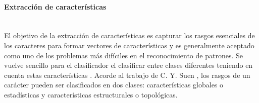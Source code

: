 	
		\paragraph{Extracción de características} ~\\
		
		El objetivo de la extracción de características es capturar los rasgos esenciales de los caracteres para formar vectores de características y es generalmente aceptado como uno de los problemas más difíciles en el reconocimiento de patrones. Se vuelve sencillo para el clasificador el clasificar entre clases diferentes teniendo en cuenta estas características \cite{PSH2011}. Acorde al trabajo de C. Y. Suen \cite{Suen86}, los rasgos de un carácter pueden ser clasificados en dos clases: características globales o estadísticas y características estructurales o topológicas.
